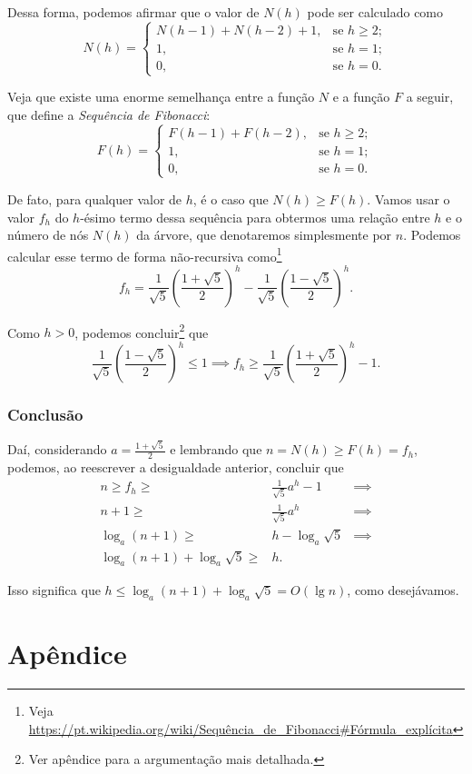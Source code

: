 \documentclass[10pt,a4paper,twoside]{article}
\theoremstyle{definition}
\begin{document}
Dessa forma, podemos afirmar que o valor de \( N(h) \) pode ser calculado como \[ N(h) = \begin{cases}
    N(h-1) + N(h-2) + 1, & \text{se } h \geq 2; \\
    1                  , & \text{se } h = 1; \\
    0                  , & \text{se } h = 0.
\end{cases} \]

Veja que existe uma enorme semelhança entre a função \( N \) e a função \( F \) a seguir, que define a \emph{Sequência de Fibonacci}: \[ F(h) = \begin{cases}
    F(h-1) + F(h-2) , & \text{se } h \geq 2; \\
    1               , & \text{se } h = 1; \\
    0               , & \text{se } h = 0.
\end{cases} \]

De fato, para qualquer valor de \( h \), é o caso que \( N(h) \geq F(h) \). Vamos usar o valor \( f_h \) do \( h \)-ésimo termo dessa sequência para obtermos uma relação entre \( h \) e o número de nós \( N(h) \) da árvore, que denotaremos simplesmente por \( n \). Podemos calcular esse termo de forma não-recursiva como\footnote{Veja \url{https://pt.wikipedia.org/wiki/Sequência_de_Fibonacci\#Fórmula_explícita}} \[ f_h = \frac{1}{\sqrt{5}}\left( \frac{1 + \sqrt{5}}{2} \right)^h - \frac{1}{\sqrt{5}}\left( \frac{1 - \sqrt{5}}{2} \right)^h. \]

Como \( h > 0 \), podemos concluir\footnote{Ver apêndice para a argumentação mais detalhada.} que \[ \frac{1}{\sqrt{5}}\left( \frac{1 - \sqrt{5}}{2} \right)^h \leq 1 \implies f_h \geq \frac{1}{\sqrt{5}}\left( \frac{1 + \sqrt{5}}{2} \right)^h - 1. \]

\section{Conclusão}
Daí, considerando \( a = \frac{1 + \sqrt{5}}{2} \) e lembrando que \( n = N(h) \geq F(h) = f_h \), podemos, ao reescrever a desigualdade anterior, concluir que
\begin{eqnarray*} 
	n \geq f_h \geq & \displaystyle\frac{1}{\sqrt{5}} a^h - 1 & \implies \\
	n + 1 \geq & \displaystyle\frac{1}{\sqrt{5}} a^h & \implies \\
	\log_a (n + 1) \geq & h - \log_a \sqrt{5} & \implies \\
	\log_a (n + 1) + \log_a \sqrt{5} \geq & h.
\end{eqnarray*}

Isso significa que \( h \leq \log_a (n + 1) + \log_a \sqrt{5} = O(\lg n) \), como desejávamos.

\part*{Apêndice}
\end{document}
